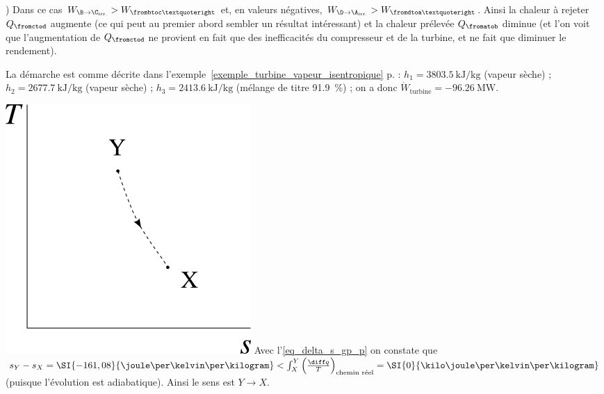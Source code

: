 \begin{description}
{						) Dans ce cas $W_{\B\to\C_\text{irr.}} > W_{\frombtoc’}$ et, en valeurs négatives, $W_{\D\to\A_\text{irr.}} > W_{\fromdtoa’}$. Ainsi la chaleur à rejeter $Q_{\fromctod}$ augmente (ce qui peut au premier abord sembler un résultat intéressant) et la chaleur prélevée $Q_{\fromatob}$ diminue (et l’on voit que l’augmentation de $Q_{\fromctod}$ ne provient en fait que des inefficacités du compresseur et de la turbine, et ne fait que diminuer le rendement).
		\item [\ref{exo_turbine_vapeur_isentropique}]
						\tab La démarche est comme décrite dans l’exemple~\ref{exemple_turbine_vapeur_isentropique} p.\pageref{exemple_turbine_vapeur_isentropique} : $h_1 = \SI{3803,5}{\kilo\joule\per\kilogram}$ (vapeur sèche) ; $h_2 = \SI{2677,7}{\kilo\joule\per\kilogram}$ (vapeur sèche) ; $h_3 = \SI{2413,6}{\kilo\joule\per\kilogram}$ (mélange de titre \SI{91,9}{\percent}) ; on a donc $\dot{W}_\text{turbine} = \SI{-96,26}{\mega\watt}$.
		\item [\ref{exo_sens_transfos_un}]
						\includegraphics[width=\solutiondiagramwidth]{images/exo_sol_ts_bonsens1.png}
						\tab\tab Avec l’\cref{eq_delta_s_gp_p} on constate que $s_Y - s_X = \SI{-161,08}{\joule\per\kelvin\per\kilogram} < \int_X^Y \left(\frac{\diff q}{T}\right)_\text{chemin réel} = \SI{0}{\kilo\joule\per\kelvin\per\kilogram}$ (puisque l’évolution est adiabatique). Ainsi le sens est $Y\to X$.
		\item [\ref{exo_sens_transfos_deux}]
}
\end{description}
